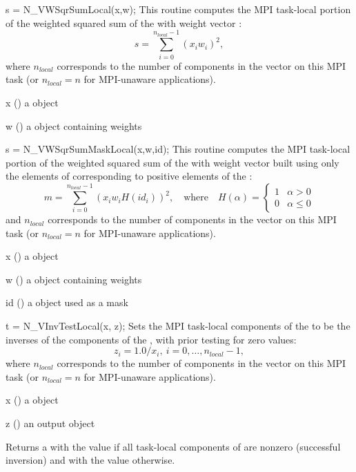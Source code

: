 {
  s = N\_VWSqrSumLocal(x,w);
}
{
  This routine computes the MPI task-local portion of the weighted
  squared sum of the   with weight vector :
  \begin{equation*}
    s = \sum_{i=0}^{n_{local}-1} (x_i w_i)^2,
  \end{equation*}
  where $n_{local}$ corresponds
  to the number of components in the vector on this MPI task (or
  $n_{local}=n$ for MPI-unaware applications).
}
{
  \begin{args}[x]
  \item[x] () a {\nvector} object
  \item[w] () a {\nvector} object containing weights
  \end{args}
}
{
}
{}

{
  s = N\_VWSqrSumMaskLocal(x,w,id);
}
{
  This routine computes the MPI task-local portion of the weighted
  squared sum of the   with weight
  vector  built using only the elements of  corresponding to
  positive elements of the  :
  \begin{equation*}
    m = \sum_{i=0}^{n_{local}-1} (x_i w_i H(id_i))^2, \quad \text{where} \quad H(\alpha)
  = \begin{cases} 1 & \alpha > 0 \\ 0 & \alpha \leq 0 \end{cases}
  \end{equation*}
  and
  $n_{local}$ corresponds to the number of components in the vector on
  this MPI task (or $n_{local}=n$ for MPI-unaware applications).
}
{
  \begin{args}[x]
  \item[x] () a {\nvector} object
  \item[w] () a {\nvector} object containing weights
  \item[id] () a {\nvector} object used as a mask 
  \end{args}
}
{
}
{}

{
  t = N\_VInvTestLocal(x, z);
}
{
  Sets the MPI task-local components of the   to
  be the inverses of the components of the  , with
  prior testing for zero values:
  \begin{equation*}
  z_i = 1.0 /  x_i  , \: i=0,\ldots,n_{local}-1,
  \end{equation*}
  where $n_{local}$
  corresponds to the number of components in the vector on this MPI task
  (or $n_{local}=n$ for MPI-unaware applications).
}
{
  \begin{args}[x]
  \item[x] () a {\nvector} object
  \item[z] () an output {\nvector} object
  \end{args}
}
{
  Returns a  with the value  if all task-local
  components of  are nonzero (successful inversion) and with the
  value  otherwise.
}
{}

